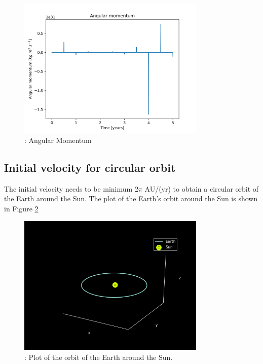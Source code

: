 \documentclass{article}
\begin{document}
    \begin{figure}[H]
        \begin{center}
            \includegraphics[width=0.8\textwidth]{./Plot/angular_momentum.png}
            \caption{: Angular Momentum}
            \label{fig:am}
        \end{center}
    \end{figure}

    \subsection{Initial velocity for circular orbit}
        The initial velocity needs to be minimum 2$\pi$ AU/(yr) to obtain a circular orbit of the Earth around the Sun.
        The plot of the Earth's orbit around the Sun is shown in Figure \ref{fig:earth_orbit}

        \begin{figure}[H]
            \begin{center}
                \includegraphics[width=0.8\textwidth]{./Plot/Earth_orbit.png}
                \caption{: Plot of the orbit of the Earth around the Sun.}
                \label{fig:earth_orbit}
            \end{center}
        \end{figure}
\end{document}

